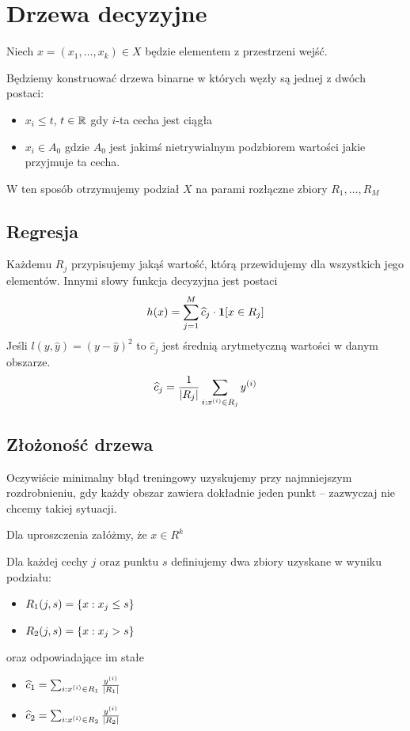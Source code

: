\section{Drzewa decyzyjne}

Niech \( x = (x_1, \dots, x_k) \in X \) będzie elementem z przestrzeni wejść.

Będziemy konstruować drzewa binarne w których węzły są jednej z dwóch postaci:
\begin{itemize}
	\item \( x_i \leq t \), \(t \in \mathbb{R}\) gdy \(i\)-ta cecha jest ciągła
	\item \( x_i \in A_0 \) gdzie \( A_0 \) jest jakimś nietrywialnym podzbiorem wartości jakie przyjmuje ta cecha.
\end{itemize}

W ten sposób otrzymujemy podział \( X \) na parami rozłączne zbiory \( R_1, \dots, R_M \)

\subsection{Regresja}

Każdemu \( R_j \) przypisujemy jakąś wartość, którą przewidujemy dla wszystkich jego elementów.
Innymi słowy funkcja decyzyjna jest postaci
\[
	h(x) = \sum_{j = 1}^M \widehat c_j \cdot \indicator{x \in R_j}
\]
Jeśli \( l(y, \widehat y) = (y - \widehat y)^2 \)
to \( \widehat c_j \) jest średnią arytmetyczną wartości w danym obszarze.
\[
	\widehat c_j = \frac{1}{\card{R_j}} \sum_{i : x^{(i)} \in R_j} y^{(i)}
\]

\subsection{Złożoność drzewa}
Oczywiście minimalny błąd treningowy uzyskujemy przy najmniejszym rozdrobnieniu, gdy każdy obszar zawiera dokładnie jeden punkt -- zazwyczaj nie chcemy takiej sytuacji.

Dla uproszczenia załóżmy, że \( x \in R^k \)

Dla każdej cechy \( j \) oraz punktu \( s \) definiujemy dwa zbiory uzyskane w wyniku podziału:
\begin{itemize}
	\item \( R_1(j, s) = \set{x : x_j \leq s} \)
	\item \( R_2(j, s) = \set{x : x_j > s} \)
\end{itemize}
oraz odpowiadające im stałe
\begin{itemize}
	\item \( \widehat c_1 = \sum_{i : x^{(i)} \in R_1} \frac{y^{(i)}}{\card{R_1}} \)
	\item \( \widehat c_2 = \sum_{i : x^{(i)} \in R_2} \frac{y^{(i)}}{\card{R_2}} \)
\end{itemize}

